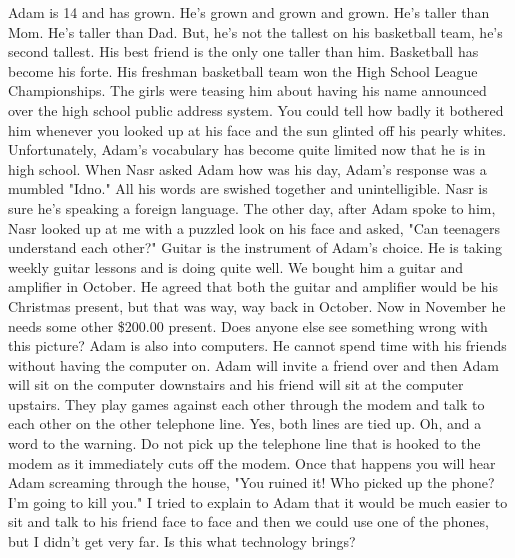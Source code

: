 Adam is 14 and has grown. He's grown and grown and grown. He's taller than Mom. He's taller than Dad.   But, he's not the tallest on his
basketball team, he's second tallest. His best friend is the only one taller than him.   Basketball has become his forte. His freshman
basketball team won the High School League Championships. The girls were teasing him about having his name announced over the high school public
address system. You could tell how badly it bothered him whenever you looked up at his face and the sun glinted off his pearly whites.
Unfortunately, Adam's vocabulary has become quite limited now that he is in high school. When Nasr asked Adam how was his day, Adam's response
was a mumbled "Idno." All his words are swished together and unintelligible. Nasr is sure he's speaking a foreign language. The other day, after
Adam spoke to him, Nasr looked up at me with a puzzled look on his face and asked, "Can teenagers understand each other?" Guitar is the
instrument of Adam's choice. He is taking weekly guitar lessons and is doing quite well. We bought him a guitar and amplifier in October. He
agreed that both the guitar and amplifier would be his Christmas present, but that was way, way back in October. Now in November he needs some
other \$200.00 present. Does anyone else see something wrong with this picture?   Adam is also into computers.   He cannot spend time with his
friends without having the computer on.   Adam will invite a friend over and then Adam will sit on the computer downstairs and his friend will
sit at the computer upstairs. They play games against each other through the modem and talk to each other on the other telephone line. Yes, both
lines are tied up. Oh, and a word to the warning. Do not pick up the telephone line that is hooked to the modem as it immediately cuts off the
modem. Once that happens you will hear Adam screaming through the house, "You ruined it!   Who picked up the phone?   I'm going to kill you." I
tried to explain to Adam that it would be much easier to sit and talk to his friend face to face and then we could use one of the phones, but I
didn't get very far. Is this what technology brings?

